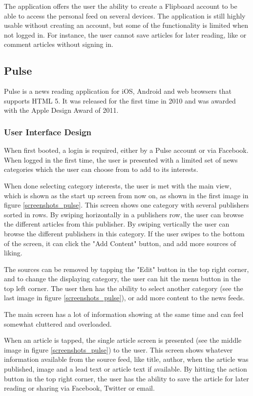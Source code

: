 The application offers the user the ability to create a Flipboard account to be able to access the personal feed on several devices. The application is still highly usable without creating an account, but some of the functionality is limited when not logged in. For instance, the user cannot save articles for later reading, like or comment articles without signing in.

\subsection{Pulse}

Pulse is a news reading application for iOS, Android and web browsers that supports HTML 5. It was released for the first time in 2010 and was awarded with the Apple Design Award of 2011\cite{pulse_apple_design_award}.

\subsubsection{User Interface Design}

When first booted, a login is required, either by a Pulse account or via Facebook. When logged in the first time, the user is presented with a limited set of news categories which the user can choose from to add to its interests. 

When done selecting category interests, the user is met with the main view, which is shown as the start up screen from now on, as shown in the first image in figure \ref{screenshots_pulse}. This screen shows one category with several publishers sorted in rows. By swiping horizontally in a publishers row, the user can browse the different articles from this publisher. By swiping vertically the user can browse the different publishers in this category. If the user swipes to the bottom of the screen, it can click the "Add Content" button, and add more sources of liking.

The sources can be removed by tapping the "Edit" button in the top right corner, and to change the displaying category, the user can hit the menu button in the top left corner. The user then has the ability to select another category (see the last image in figure \ref{screenshots_pulse}), or add more content to the news feeds.

The main screen has a lot of information showing at the same time and can feel somewhat cluttered and overloaded.

When an article is tapped, the single article screen is presented (see the middle image in figure \ref{screenshots_pulse}) to the user. This screen shows whatever information available from the source feed, like title, author, when the article was published, image and a lead text or article text if available. By hitting the action button in the top right corner, the user has the ability to save the article for later reading or sharing via Facebook, Twitter or email. 

